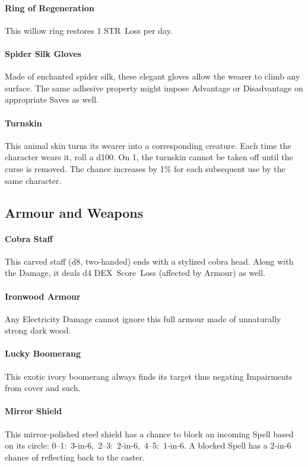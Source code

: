 \documentclass[itdr/core]{subfiles}
\begin{document}
\vfill
\paragraph{Ring of Regeneration}
This willow ring restores 1 STR~Loss per day.

\vfill
\paragraph{Spider Silk Gloves}
Made of enchanted spider silk, these elegant gloves allow the wearer to climb any surface. The same adhesive property might impose Advantage or Disadvantage on appropriate Saves as well.

\vfill
\paragraph{Turnskin}
This animal skin turns its wearer into a corresponding creature. Each time the character wears it, roll a d100. On 1, the turnskin cannot be taken off until the curse is removed. The chance increases by 1\% for each subsequent use by the same character.

\vfill
\break

\subsection*{Armour and Weapons}

\paragraph{Cobra Staff}
This carved staff (d8, two-handed) ends with a stylized cobra head. Along with the Damage, it deals d4 DEX~Score~Loss (affected by Armour) as well.

\paragraph{Ironwood Armour}
Any Electricity Damage cannot ignore this full \mbox{armour} made of unnaturally strong dark wood.

\paragraph{Lucky Boomerang}
This exotic ivory boomerang always finds its target thus negating Impairments from cover and such.

\paragraph{Mirror Shield}
This mirror-polished steel shield has a chance to block an incoming Spell based on its circle: \mbox{0--1: 3-in-6, 2--3: 2-in-6, 4--5: 1-in-6}. A blocked Spell has a 2-in-6 chance of reflecting back to the caster.
\end{document}
